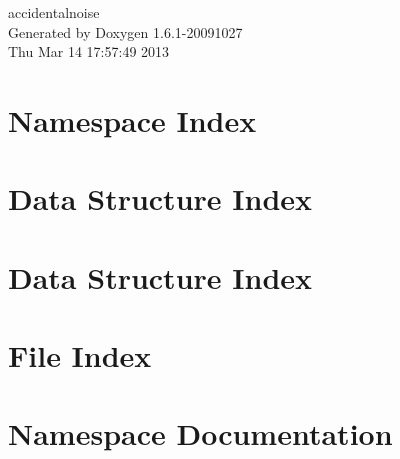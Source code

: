\documentclass[a4paper]{book}
\begin{document}
\hypersetup{pageanchor=false}
\begin{titlepage}
\vspace*{7cm}
\begin{center}
{\Large accidentalnoise }\\
\vspace*{1cm}
{\large Generated by Doxygen 1.6.1-20091027}\\
\vspace*{0.5cm}
{\small Thu Mar 14 17:57:49 2013}\\
\end{center}
\end{titlepage}
\clearemptydoublepage
{}
\tableofcontents
\clearemptydoublepage
{}
\hypersetup{pageanchor=true}
\chapter{Namespace Index}

\chapter{Data Structure Index}

\chapter{Data Structure Index}

\chapter{File Index}

\chapter{Namespace Documentation}


\end{document}
